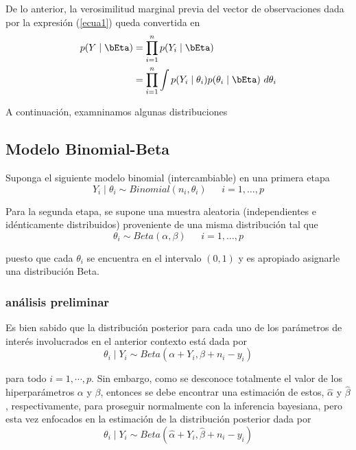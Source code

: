 \documentclass[10pt,openright]{book}\usepackage[]{graphicx}\usepackage[]{color}
\begin{document}
De lo anterior, la verosimilitud marginal previa del vector de observaciones dada por la expresi\'on (\ref{ecua1}) queda convertida en
\begin{align}
p(Y \mid \bEta)&=\prod_{i=1}^np(Y_i \mid \bEta) \notag \\
&=\prod_{i=1}^n\int p(Y_i \mid \theta_i)p(\theta_i \mid \bEta) \ d\theta_i
\end{align}

A continuaci\'on, examninamos algunas distribuciones 

\subsection{Modelo Binomial-Beta}\label{Binomial-Beta}
Suponga el siguiente modelo binomial (intercambiable) en una primera etapa
\begin{equation*}
Y_i \mid \theta_i \sim Binomial(n_i,\theta_i)  \ \ \ \ \ \ \ i=1,\ldots,p
\end{equation*}

Para la segunda etapa, se supone una muestra aleatoria (independientes e id\'enticamente distribuidos) proveniente de una misma distribuci\'on tal que
\begin{equation*}
\theta_i \sim Beta(\alpha, \beta)  \ \ \ \ \ \ \ i=1,\ldots,p
\end{equation*}

puesto que cada $\theta_i$ se encuentra en el intervalo $(0,1)$ y es apropiado asignarle una distribuci\'on Beta.
\subsubsection{an\'alisis preliminar}

Es bien sabido que la distribuci\'on posterior para cada uno de los par\'ametros de inter\'es involucrados en el anterior contexto est\'a dada por
\begin{equation*}
\theta_i \mid Y_i \sim Beta(\alpha+Y_i, \beta+n_i-y_i)
\end{equation*}

para todo $i=1,\cdots,p$. Sin embargo, como se desconoce totalmente el valor de los hiperpar\'ametros $\alpha$ y $\beta$, entonces se debe encontrar una estimaci\'on de estos, $\hat{\alpha}$ y $\hat{\beta}$, respectivamente, para proseguir normalmente con la inferencia bayesiana, pero esta vez enfocados en la estimaci\'on de la distribuci\'on posterior dada por
\begin{equation*}
\theta_i \mid Y_i \sim Beta(\hat{\alpha}+Y_i, \hat{\beta}+n_i-y_i)
\end{equation*}
\end{document}
